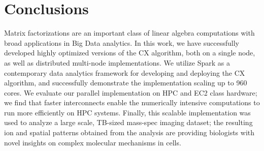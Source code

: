 \section{Conclusions}
\label{sec:conclusion}

Matrix factorizations are an important class of linear algebra computations with
broad applications in Big Data analytics. In this work, we have successfully 
developed highly optimized versions of the CX algorithm, both on a single node, as
well as distributed multi-node implementations. We utilize Spark as a 
contemporary data analytics framework for developing and deploying the CX algorithm, and 
successfully demonstrate the implementation scaling up to 960 cores. We evaluate 
our parallel implementation on HPC and EC2 class hardware; we find that faster 
interconnects enable the numerically intensive computations to run more 
efficiently on HPC systems. Finally, this scalable implementation was used to analyze a 
large scale, TB-sized mass-spec imaging dataset; the resulting ion and spatial 
patterns obtained from the analysis are providing biologists with novel insights on
complex molecular mechanisms in cells. 
